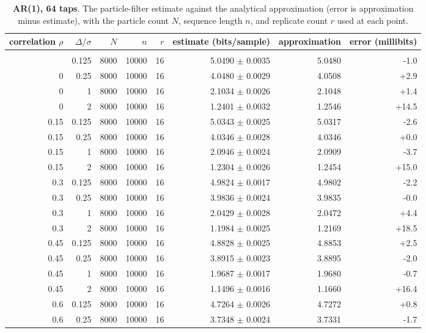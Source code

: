 {\small
\begin{longtable}[]{@{}rrrrrrrr@{}}
\toprule\noalign{}
correlation $\rho$ & $\Delta/\sigma$ & $N$ & $n$ & $r$ & estimate (bits/sample) & approximation & error (millibits) \\
\midrule\noalign{}
\endhead
\bottomrule\noalign{}
\caption{\textbf{AR(1), 64 taps}. The particle-filter estimate against the analytical approximation (error is approximation minus estimate), with the particle count $N$, sequence length $n$, and replicate count $r$ used at each point.}\label{tab:family2}\\
\endlastfoot
0 & 0.125 & 8000 & 10000 & 16 & 5.0490 $\pm$ 0.0035 & 5.0480 & -1.0 \\
0 & 0.25 & 8000 & 10000 & 16 & 4.0480 $\pm$ 0.0029 & 4.0508 & +2.9 \\
0 & 1 & 8000 & 10000 & 16 & 2.1034 $\pm$ 0.0026 & 2.1048 & +1.4 \\
0 & 2 & 8000 & 10000 & 16 & 1.2401 $\pm$ 0.0032 & 1.2546 & +14.5 \\
0.15 & 0.125 & 8000 & 10000 & 16 & 5.0343 $\pm$ 0.0025 & 5.0317 & -2.6 \\
0.15 & 0.25 & 8000 & 10000 & 16 & 4.0346 $\pm$ 0.0028 & 4.0346 & +0.0 \\
0.15 & 1 & 8000 & 10000 & 16 & 2.0946 $\pm$ 0.0024 & 2.0909 & -3.7 \\
0.15 & 2 & 8000 & 10000 & 16 & 1.2304 $\pm$ 0.0026 & 1.2454 & +15.0 \\
0.3 & 0.125 & 8000 & 10000 & 16 & 4.9824 $\pm$ 0.0017 & 4.9802 & -2.2 \\
0.3 & 0.25 & 8000 & 10000 & 16 & 3.9836 $\pm$ 0.0024 & 3.9835 & -0.0 \\
0.3 & 1 & 8000 & 10000 & 16 & 2.0429 $\pm$ 0.0028 & 2.0472 & +4.4 \\
0.3 & 2 & 8000 & 10000 & 16 & 1.1984 $\pm$ 0.0025 & 1.2169 & +18.5 \\
0.45 & 0.125 & 8000 & 10000 & 16 & 4.8828 $\pm$ 0.0025 & 4.8853 & +2.5 \\
0.45 & 0.25 & 8000 & 10000 & 16 & 3.8915 $\pm$ 0.0023 & 3.8895 & -2.0 \\
0.45 & 1 & 8000 & 10000 & 16 & 1.9687 $\pm$ 0.0017 & 1.9680 & -0.7 \\
0.45 & 2 & 8000 & 10000 & 16 & 1.1496 $\pm$ 0.0016 & 1.1660 & +16.4 \\
0.6 & 0.125 & 8000 & 10000 & 16 & 4.7264 $\pm$ 0.0026 & 4.7272 & +0.8 \\
0.6 & 0.25 & 8000 & 10000 & 16 & 3.7348 $\pm$ 0.0024 & 3.7331 & -1.7 \\

\end{longtable}}
